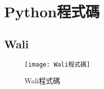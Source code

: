 \chapter{Python程式碼}
\section{Wali}
\begin{figure}[!ht]
\centering
\texttt{[image: Wali程式碼]}
\caption{\Large Wali程式碼}
\label{fig:wali_code}
\end{figure}

\newpage
